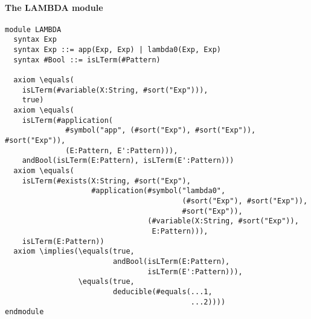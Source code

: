 \documentclass[UTF8,11pt]{article}
\theoremstyle{plain}
\theoremstyle{definition}
\theoremstyle{remark}
\begin{document}
\paragraph{The {\small LAMBDA} module}\quad
\begin{Verbatim}[fontsize=\small]
module LAMBDA
  syntax Exp
  syntax Exp ::= app(Exp, Exp) | lambda0(Exp, Exp)
  syntax #Bool ::= isLTerm(#Pattern)

  axiom \equals(
    isLTerm(#variable(X:String, #sort("Exp"))), 
    true)
  axiom \equals(
    isLTerm(#application(
              #symbol("app", (#sort("Exp"), #sort("Exp")), #sort("Exp")),
              (E:Pattern, E':Pattern))),
    andBool(isLTerm(E:Pattern), isLTerm(E':Pattern)))
  axiom \equals(
    isLTerm(#exists(X:String, #sort("Exp"),
                    #application(#symbol("lambda0",
                                         (#sort("Exp"), #sort("Exp")),
                                         #sort("Exp")),
                                 (#variable(X:String, #sort("Exp")),
                                  E:Pattern))),
    isLTerm(E:Pattern))
  axiom \implies(\equals(true, 
                         andBool(isLTerm(E:Pattern), 
                                 isLTerm(E':Pattern))),
                 \equals(true,
                         deducible(#equals(...1,
                                           ...2)))) 
endmodule
\end{Verbatim}




\end{document}
